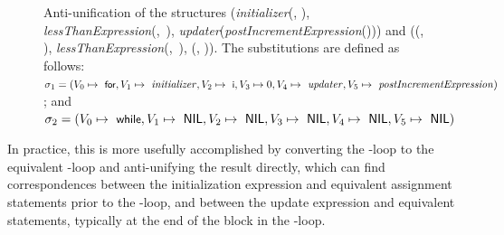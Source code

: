 \begin{figure}[t]
\centering{}
\caption[Complex anti-unification of two structures demonstrating a \protect\NIL{}-theory.]{Anti-unification of the structures (\textit{initializer}(, ), \mbox{\textit{lessThanExpression}(, ),} \textit{updater}(\textit{postIncrementExpression}())) and (\NIL{}(\NIL{}, \NIL{}), \mbox{\textit{lessThanExpression}(, ),} \NIL{}(\NIL{}, \NIL{})). The substitutions are defined as follows: $\sigma_1 = (V_0 \mapsto \text{ \textsf{\small for}}, V_1 \mapsto \text{ \textit{initializer}}, V_2 \mapsto \text{ \textsf{\small i}}, V_3 \mapsto 0, V_4 \mapsto \text{ \textit{updater}}, V_5 \mapsto \text{ \textit{postIncrementExpression}})$; and $\sigma_2 = (V_0 \mapsto \text{ \textsf{\small while}}, V_1 \mapsto \text{ \textsf{NIL}}, V_2 \mapsto \text{ \textsf{NIL}}, V_3 \mapsto \text{ \textsf{NIL}}, V_4 \mapsto \text{ \textsf{NIL}}, V_5 \mapsto \text{ \textsf{NIL}})$\label{fig:for-while}}
\end{figure}

In practice, this is more usefully accomplished by converting the -loop to the equivalent -loop and anti-unifying the result directly, which can find correspondences between the initialization expression and equivalent assignment statements prior to the -loop, and between the update expression and equivalent statements, typically at the end of the block in the -loop.

